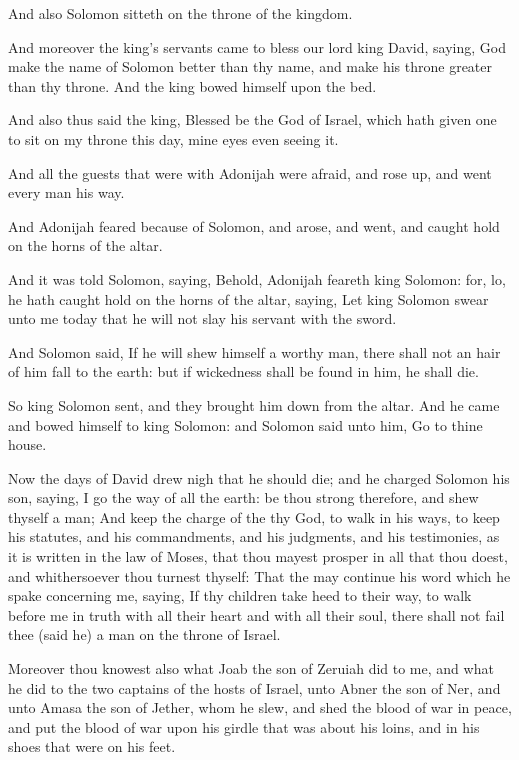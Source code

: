 \Verse And also Solomon sitteth on the throne of the kingdom.

\Verse And moreover the king's servants came to bless our lord king David, saying, God make the name of Solomon better than thy name, and make his throne greater than thy throne. And the king bowed himself upon the bed.

\Verse And also thus said the king, Blessed be the \LORD God of Israel, which hath given one to sit on my throne this day, mine eyes even seeing it.

\Verse And all the guests that were with Adonijah were afraid, and rose up, and went every man his way.

\Verse And Adonijah feared because of Solomon, and arose, and went, and caught hold on the horns of the altar.

\Verse And it was told Solomon, saying, Behold, Adonijah feareth king Solomon: for, lo, he hath caught hold on the horns of the altar, saying, Let king Solomon swear unto me today that he will not slay his servant with the sword.

\Verse And Solomon said, If he will shew himself a worthy man, there shall not an hair of him fall to the earth: but if wickedness shall be found in him, he shall die.

\Verse So king Solomon sent, and they brought him down from the altar.  And he came and bowed himself to king Solomon: and Solomon said unto him, Go to thine house.


\Chapter
\Verse Now the days of David drew nigh that he should die; and he charged Solomon his son, saying, \Verse I go the way of all the earth: be thou strong therefore, and shew thyself a man; \Verse And keep the charge of the \LORD thy God, to walk in his ways, to keep his statutes, and his commandments, and his judgments, and his testimonies, as it is written in the law of Moses, that thou mayest prosper in all that thou doest, and whithersoever thou turnest thyself: \Verse That the \LORD may continue his word which he spake concerning me, saying, If thy children take heed to their way, to walk before me in truth with all their heart and with all their soul, there shall not fail thee (said he) a man on the throne of Israel.

\Verse Moreover thou knowest also what Joab the son of Zeruiah did to me, and what he did to the two captains of the hosts of Israel, unto Abner the son of Ner, and unto Amasa the son of Jether, whom he slew, and shed the blood of war in peace, and put the blood of war upon his girdle that was about his loins, and in his shoes that were on his feet.

